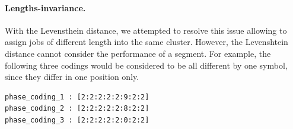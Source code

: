\documentclass{jhps}
\begin{document}

\medskip

\paragraph{Lengths-invariance.}
With the Levensthein distance, we attempted to resolve this issue allowing to assign jobs of different length into the same cluster.
However, the Levenshtein distance cannot consider the performance of a segment.
For example, the following three codings would be considered to be all different by one symbol, since they differ in one position only.

\begin{lstlisting}
phase_coding_1 : [2:2:2:2:2:9:2:2]
phase_coding_2 : [2:2:2:2:2:8:2:2]
phase_coding_3 : [2:2:2:2:2:0:2:2]
\end{lstlisting}
\end{document}

